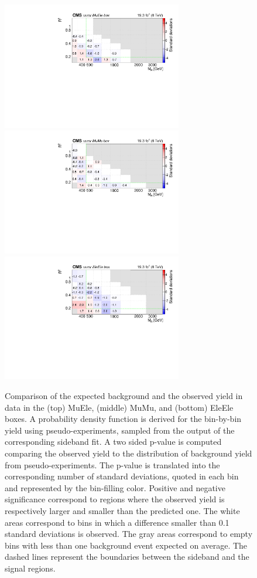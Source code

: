 \begin{figure}[tb!]
\centering
\includegraphics[width=0.7\textwidth]{figs/analysis8TeV/nSigmaLog_MuEle.pdf}
\includegraphics[width=0.7\textwidth]{figs/analysis8TeV/nSigmaLog_MuMu.pdf}
\includegraphics[width=0.7\textwidth]{figs/analysis8TeV/nSigmaLog_EleEle.pdf}
\caption{Comparison of the expected background and the observed yield
  in data in the (top) MuEle, (middle) MuMu, and (bottom)
  EleEle boxes. A probability density function is derived for the
  bin-by-bin yield using pseudo-experiments, sampled from the output
  of the corresponding sideband fit. A two sided p-value is computed
  comparing the observed yield to the distribution of background yield
  from pseudo-experiments. The p-value is translated into the
  corresponding number of standard deviations, quoted in each bin and
  represented by the bin-filling color. Positive and negative
  significance correspond to regions where the observed yield is
  respectively larger and smaller than the predicted one. The white areas
  correspond to bins in which a difference smaller than 0.1 standard
  deviations is observed. The gray areas correspond to empty bins with
  less than one background event expected on average. The dashed lines
  represent the boundaries between the sideband and the signal
  regions.\label{fig:FrenchFlagDilep}}


\end{figure}
